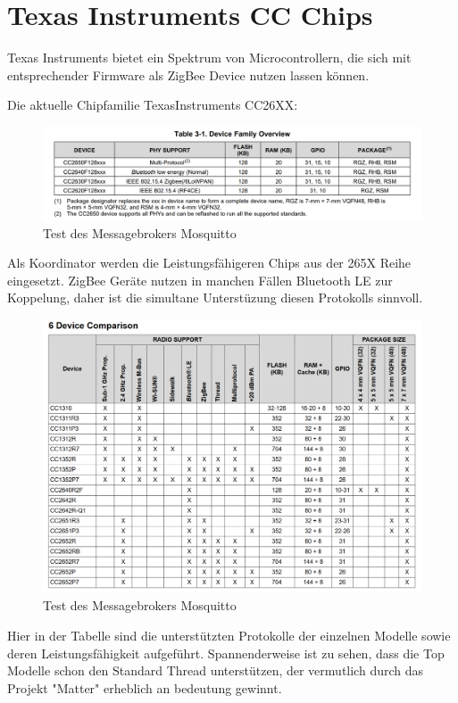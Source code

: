 \section{Texas Instruments CC Chips}

Texas Instruments bietet ein Spektrum von Microcontrollern, die sich mit entsprechender Firmware als ZigBee Device
nutzen lassen können. 

Die aktuelle Chipfamilie TexasInstruments CC26XX:

\begin{figure}[H]
  \centering
  \includegraphics[width=1\textwidth]{media/table26xx.png}
  \caption{Test des Messagebrokers Mosquitto}
\end{figure}

Als Koordinator werden die Leistungsfähigeren Chips aus der 265X Reihe eingesetzt. ZigBee Geräte nutzen in manchen
Fällen Bluetooth LE zur Koppelung, daher ist die simultane Unterstüzung diesen Protokolls sinnvoll.

\begin{figure}[H]
  \centering
  \includegraphics[width=1\textwidth]{media/table265x.png}
  \caption{Test des Messagebrokers Mosquitto}
\end{figure}

Hier in der Tabelle sind die unterstützten Protokolle der einzelnen Modelle sowie deren Leistungsfähigkeit aufgeführt.
Spannenderweise ist zu sehen, dass die Top Modelle schon den Standard Thread unterstützen, der vermutlich durch das
Projekt "Matter" erheblich an bedeutung gewinnt.

